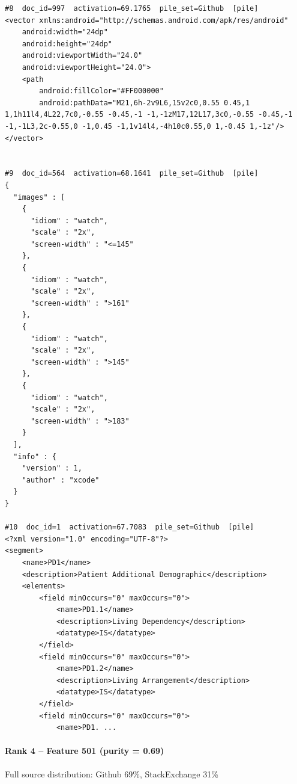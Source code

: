 \begin{verbatim}
#8  doc_id=997  activation=69.1765  pile_set=Github  [pile]
<vector xmlns:android="http://schemas.android.com/apk/res/android"
    android:width="24dp"
    android:height="24dp"
    android:viewportWidth="24.0"
    android:viewportHeight="24.0">
    <path
        android:fillColor="#FF000000"
        android:pathData="M21,6h-2v9L6,15v2c0,0.55 0.45,1 1,1h11l4,4L22,7c0,-0.55 -0.45,-1 -1,-1zM17,12L17,3c0,-0.55 -0.45,-1 -1,-1L3,2c-0.55,0 -1,0.45 -1,1v14l4,-4h10c0.55,0 1,-0.45 1,-1z"/>
</vector>


#9  doc_id=564  activation=68.1641  pile_set=Github  [pile]
{
  "images" : [
    {
      "idiom" : "watch",
      "scale" : "2x",
      "screen-width" : "<=145"
    },
    {
      "idiom" : "watch",
      "scale" : "2x",
      "screen-width" : ">161"
    },
    {
      "idiom" : "watch",
      "scale" : "2x",
      "screen-width" : ">145"
    },
    {
      "idiom" : "watch",
      "scale" : "2x",
      "screen-width" : ">183"
    }
  ],
  "info" : {
    "version" : 1,
    "author" : "xcode"
  }
}

#10  doc_id=1  activation=67.7083  pile_set=Github  [pile]
<?xml version="1.0" encoding="UTF-8"?>
<segment>
    <name>PD1</name>
    <description>Patient Additional Demographic</description>
    <elements>
        <field minOccurs="0" maxOccurs="0">
            <name>PD1.1</name>
            <description>Living Dependency</description>
            <datatype>IS</datatype>
        </field>
        <field minOccurs="0" maxOccurs="0">
            <name>PD1.2</name>
            <description>Living Arrangement</description>
            <datatype>IS</datatype>
        </field>
        <field minOccurs="0" maxOccurs="0">
            <name>PD1. ...

\end{verbatim}

\paragraph*{Rank 4 -- Feature 501 (purity = 0.69)}

Full source distribution: Github 69\%, StackExchange 31\%

